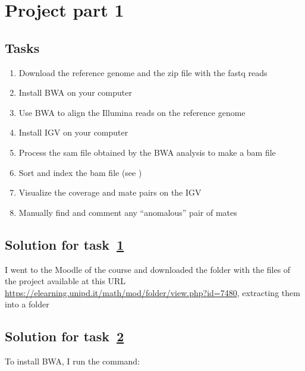 \chapter{Project part 1}
\section{Tasks}
\begin{enumerate}
\item Download the reference genome and the zip file with the fastq reads
\label{itm:1.1}

\item Install BWA on your computer
\label{itm:1.2}

\item Use BWA to align the Illumina reads on the reference genome
\label{itm:1.3}

\item Install IGV on your computer
\label{itm:1.4}

\item Process the sam file obtained by the BWA analysis to make a bam file
\label{itm:1.5}

\item Sort and index the bam file (see )
\label{itm:1.6}

\item Visualize the coverage and mate pairs on the IGV
\label{itm:1.7}

\item Manually find and comment any ``anomalous'' pair of mates
\label{itm:1.8}
\end{enumerate}

\section{Solution for task~\hyperref[itm:1.1]{1}}
I went to the Moodle of the course and downloaded the folder with the files of
the project available at this URL 
\url{https://elearning.unipd.it/math/mod/folder/view.php?id=7480}, extracting
them into a folder

\section{Solution for task~\hyperref[itm:1.2]{2}}
To install BWA, I run the command:


